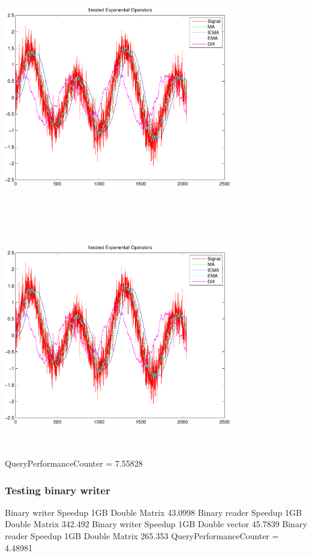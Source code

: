 \documentclass[9pt]{article}
\theoremstyle{plain}
\theoremstyle{definition}
\theoremstyle{remark}
\numberwithin{equation}{section}
\begin{document}
\includegraphics[width=10.0cm,height=10.0cm]{IteratedExponentailOperators.pdf}

\includegraphics[width=10.0cm,height=10.0cm]{IteratedExponentailOperators.pdf}

QueryPerformanceCounter  =  7.55828
\subsubsection{Testing binary writer}
Binary writer Speedup 1GB Double Matrix 43.0998
Binary reader Speedup 1GB Double Matrix 342.492
Binary writer Speedup 1GB Double vector 45.7839
Binary reader Speedup 1GB Double Matrix 265.353
QueryPerformanceCounter  =  4.48981
\end{document}
